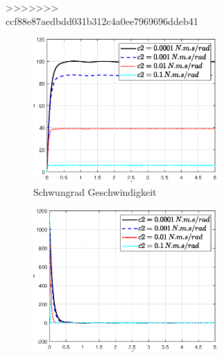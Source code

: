 \begin{figure}
\begin{figure}
>>>>>>> ccf88e87aedbdd031b312c4a0ee7969696ddeb41
    \captionsetup[subfigure]{justification=centering,font=footnotesize}
    \begin{subfigure}[b]{0.49\linewidth}
        \includegraphics[width=\linewidth]{Bilder/5_sensi/fig/c2/phi_punkt.eps}
        \caption{Schwungrad Geschwindigkeit}
        \label{fig:c2_phi_punkt}
    \end{subfigure}
    \begin{subfigure}[b]{0.49 \linewidth}
        \includegraphics[width=\linewidth]{Bilder/5_sensi/fig/c2/phi_punkt_punkt.eps}

\end{subfigure}
\end{figure}
\end{figure}
